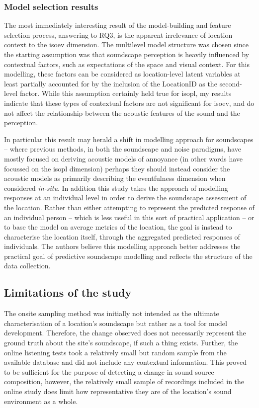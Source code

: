    \subsubsection{Model selection results}

   The most immediately interesting result of the model-building and feature selection process, answering to RQ3, is the apparent irrelevance of location context to the \gls{isoev} dimension. The multilevel model structure was chosen since the starting assumption was that soundscape perception is heavily influenced by contextual factors, such as expectations of the space and visual context. For this modelling, these factors can be considered as location-level latent variables at least partially accounted for by the inclusion of the LocationID as the second-level factor. While this assumption certainly held true for \gls{isopl}, my results indicate that these types of contextual factors are not significant for \gls{isoev}, and do not affect the relationship between the acoustic features of the sound and the perception.

   In particular this result may herald a shift in modelling approach for soundscapes -- where previous methods, in both the soundscape and noise paradigms, have mostly focused on deriving acoustic models of annoyance (in other words have focussed on the \gls{isopl} dimension) perhaps they should instead consider the acoustic models as primarily describing the eventfulness dimension when considered \emph{in-situ}. In addition this study takes the approach of modelling responses at an individual level in order to derive the soundscape assessment of the location. Rather than either attempting to represent the predicted response of an individual person -- which is less useful in this sort of practical application -- or to base the model on average metrics of the location, the goal is instead to characterise the location itself, through the aggregated predicted responses of individuals. The authors believe this modelling approach better addresses the practical goal of predictive soundscape modelling and reflects the structure of the data collection.


 \subsection{Limitations of the study}

   The onsite sampling method was initially not intended as the ultimate characterisation of a location's soundscape but rather as a tool for model development. Therefore, the change observed does not necessarily represent the ground truth about the site's soundscape, if such a thing exists. Further, the online listening tests took a relatively small but random sample from the available database and did not include any contextual information. This proved to be sufficient for the purpose of detecting a change in sound source composition, however, the relatively small sample of recordings included in the online study does limit how representative they are of the location's sound environment as a whole.

